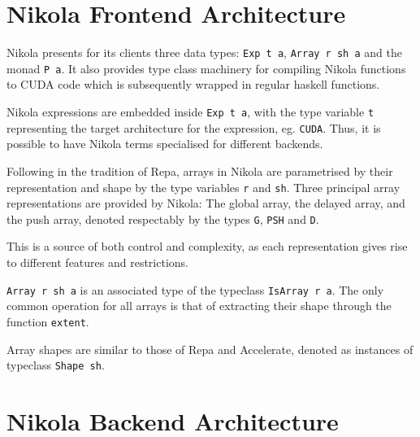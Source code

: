 \section{Nikola Frontend Architecture}


Nikola presents for its clients three data types: \texttt{Exp t a},
\texttt{Array r sh a} and the monad \texttt{P a}. It also provides type class
machinery for compiling Nikola functions to CUDA code which is subsequently
wrapped in regular haskell functions.

Nikola expressions are embedded inside \texttt{Exp t a}, with the type variable
\texttt{t} representing the target architecture for the expression, eg.
\texttt{CUDA}. Thus, it is possible to have Nikola terms specialised for
different backends.

Following in the tradition of Repa, arrays in Nikola are parametrised by their
representation and shape by the type variables \texttt{r} and \texttt{sh}.
Three principal array representations are provided by Nikola: The global array,
the delayed array, and the push array, denoted respectably by the types
\texttt{G}, \texttt{PSH} and \texttt{D}.

This is a source of both control and complexity, as each representation gives
rise to different features and restrictions.

\texttt{Array r sh a} is an associated type of the typeclass \texttt{IsArray r
a}. The only common operation for all arrays is that of extracting their shape
through the function \texttt{extent}.

Array shapes are similar to those of Repa and Accelerate, denoted as instances of typeclass \texttt{Shape sh}.

\section{Nikola Backend Architecture}

